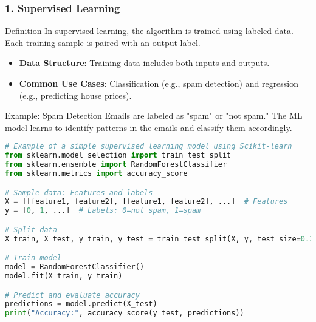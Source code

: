 \documentclass[aspectratio=169]{beamer}
\begin{document}
\begin{frame}[fragile]
    \frametitle{1. Supervised Learning}
    
    \begin{block}{Definition}
        In supervised learning, the algorithm is trained using labeled data. Each training sample is paired with an output label.
    \end{block}

    \begin{itemize}
        \item \textbf{Data Structure}: Training data includes both inputs and outputs.
        \item \textbf{Common Use Cases}: Classification (e.g., spam detection) and regression (e.g., predicting house prices).
    \end{itemize}

    \begin{block}{Example: Spam Detection}
        Emails are labeled as "spam" or "not spam." The ML model learns to identify patterns in the emails and classify them accordingly.
    \end{block}

    \begin{lstlisting}[language=Python, caption={Simple Supervised Learning Model}]
# Example of a simple supervised learning model using Scikit-learn
from sklearn.model_selection import train_test_split
from sklearn.ensemble import RandomForestClassifier
from sklearn.metrics import accuracy_score

# Sample data: Features and labels
X = [[feature1, feature2], [feature1, feature2], ...]  # Features
y = [0, 1, ...]  # Labels: 0=not spam, 1=spam

# Split data
X_train, X_test, y_train, y_test = train_test_split(X, y, test_size=0.2)

# Train model
model = RandomForestClassifier()
model.fit(X_train, y_train)

# Predict and evaluate accuracy
predictions = model.predict(X_test)
print("Accuracy:", accuracy_score(y_test, predictions))
    \end{lstlisting}
\end{frame}
\end{document}
